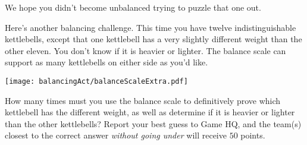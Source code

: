 \begin{extraPuzzle}
  We hope you didn't become unbalanced trying to puzzle that one out.

  Here's another balancing challenge. This time you have twelve
  indistinguishable kettlebells, except that one kettlebell has a very
  slightly different weight than the other eleven.
  You don't know if it is heavier or
  lighter. The balance scale can support as many kettlebells on either
  side as you'd like.

  \begin{center}
    \texttt{[image: balancingAct/balanceScaleExtra.pdf]}
  \end{center}

  How many times must you use the balance scale to definitively prove
  which kettlebell has the different weight, as well as determine if it
  is heavier or lighter than the other kettlebells?
  Report your best guess to Game HQ, and the team(s) closest to the correct
  answer \textit{without going under} will receive \(50\) points.
\end{extraPuzzle}